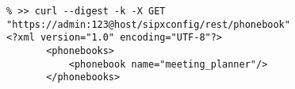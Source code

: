 \begin{lstlisting}
% >> curl --digest -k -X GET "https://admin:123@host/sipxconfig/rest/phonebook"
<?xml version="1.0" encoding="UTF-8"?>
       <phonebooks>
           <phonebook name="meeting_planner"/>
       </phonebooks>
\end{lstlisting}



